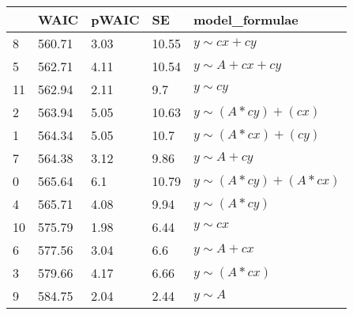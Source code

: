 \begin{tabular}{lllll}
\toprule
{} &    WAIC & pWAIC &     SE &          model_formulae \\
\midrule
8  &  560.71 &  3.03 &  10.55 &          $y \sim cx+cy$ \\
5  &  562.71 &  4.11 &  10.54 &        $y \sim A+cx+cy$ \\
11 &  562.94 &  2.11 &    9.7 &             $y \sim cy$ \\
2  &  563.94 &  5.05 &  10.63 &    $y \sim (A*cy)+(cx)$ \\
1  &  564.34 &  5.05 &   10.7 &    $y \sim (A*cx)+(cy)$ \\
7  &  564.38 &  3.12 &   9.86 &           $y \sim A+cy$ \\
0  &  565.64 &   6.1 &  10.79 &  $y \sim (A*cy)+(A*cx)$ \\
4  &  565.71 &  4.08 &   9.94 &         $y \sim (A*cy)$ \\
10 &  575.79 &  1.98 &   6.44 &             $y \sim cx$ \\
6  &  577.56 &  3.04 &    6.6 &           $y \sim A+cx$ \\
3  &  579.66 &  4.17 &   6.66 &         $y \sim (A*cx)$ \\
9  &  584.75 &  2.04 &   2.44 &              $y \sim A$ \\
\bottomrule
\end{tabular}
